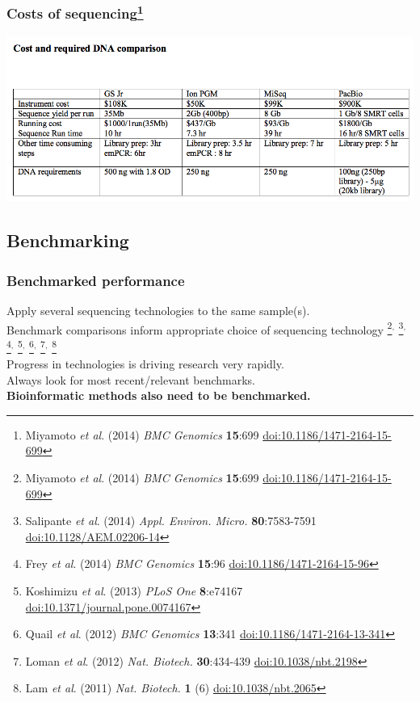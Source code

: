 \begin{frame}
  \frametitle{Costs of sequencing\footnote{\tiny{Miyamoto \textit{et al}. (2014) \textit{BMC Genomics} \textbf{15}:699 \href{http://dx.doi.org/10.1186/1471-2164-15-699}{doi:10.1186/1471-2164-15-699}}}}
    \begin{center}
      \includegraphics[width=1\textwidth]{images/miyamoto_costs}
    \end{center}      
\end{frame}

\subsection{Benchmarking}

\begin{frame}
  \frametitle{Benchmarked performance}
  Apply several sequencing technologies to the same sample(s). \\  
  Benchmark comparisons inform appropriate choice of sequencing technology%
\footnote{\tiny{Miyamoto \textit{et al}. (2014) \textit{BMC Genomics} \textbf{15}:699 \href{http://dx.doi.org/10.1186/1471-2164-15-699}{doi:10.1186/1471-2164-15-699}}}$^{,}$%
\footnote{\tiny{Salipante \textit{et al}. (2014) \textit{Appl. Environ. Micro.} \textbf{80}:7583-7591 \href{http://dx.doi.org/10.1128/AEM.02206-14}{doi:10.1128/AEM.02206-14}}}$^{,}$%
\footnote{\tiny{Frey \textit{et al}. (2014) \textit{BMC Genomics} \textbf{15}:96 \href{http://dx.doi.org/10.1186/1471-2164-15-96}{doi:10.1186/1471-2164-15-96}}}$^{,}$%
\footnote{\tiny{Koshimizu \textit{et al}. (2013) \textit{PLoS One} \textbf{8}:e74167 \href{http://dx.doi.org/10.1371/journal.pone.0074167}{doi:10.1371/journal.pone.0074167}}}$^{,}$%
\footnote{\tiny{Quail \textit{et al}. (2012) \textit{BMC Genomics} \textbf{13}:341 \href{http://dx.doi.org/10.1186/1471-2164-13-341}{doi:10.1186/1471-2164-13-341}}}$^{,}$%
\footnote{\tiny{Loman \textit{et al}. (2012) \textit{Nat. Biotech.} \textbf{30}:434-439 \href{http://dx.doi.org/10.1038/nbt.2198}{doi:10.1038/nbt.2198}}}$^{,}$%
\footnote{\tiny{Lam \textit{et al}. (2011) \textit{Nat. Biotech.} \textbf{1} (6) \href{http://dx.doi.org/10.1038/nbt.2065}{doi:10.1038/nbt.2065}}} \\[0.5cm]
  Progress in technologies is driving research very rapidly. \\
  Always look for most recent/relevant benchmarks. \\[0.5cm]
  \textbf{Bioinformatic methods also need to be benchmarked.}
\end{frame}


